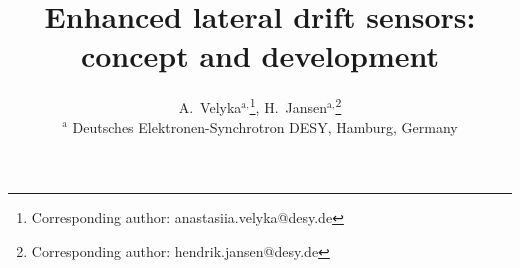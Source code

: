 \documentclass[a4paper,10pt]{article}
\makeatletter
\newcommand*{\notFOREPJ}{}%
\renewcommand{\maketitle}{\bgroup\setlength{\parindent}{0pt}
\begin{flushleft}
  \vspace*{10mm}
  \textbf{\huge\sffamily\@title}
  \vspace{5mm}
   
  \large \@author
\end{flushleft}\egroup
}
\makeatother
\begin{document}
\ifdefined\notFOREPJ
\else
\fi









\title{Enhanced lateral drift sensors: concept and development}
\author{
A.~Velyka${}^{\textrm{a,}}$\footnote[*]{Corresponding author: anastasiia.velyka@desy.de}, %
H.~Jansen${}^{\textrm{a,}}$\footnote[**]{Corresponding author: hendrik.jansen@desy.de}%
\\
\vspace{3mm}
${}^{\textrm{a}}$ Deutsches Elektronen-Synchrotron DESY, Hamburg, Germany\\
\vspace{3mm}
}
\maketitle
\end{document}
